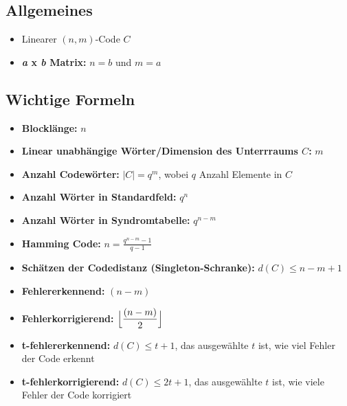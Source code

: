 \subsection{Allgemeines}

\begin{itemize}
\item Linearer $(n,m)$-Code $C$
\item \textbf{\textit{a} x \textit{b} Matrix:} $n = b$ und $m = a$
\end{itemize}

\subsection{Wichtige Formeln}

\begin{itemize}
\item \textbf{Blocklänge:} $\displaystyle n$
\item \textbf{Linear unabhängige Wörter/Dimension des Unterrraums $C$:} $m$
\item \textbf{Anzahl Codewörter:} $|C| = q^m$, wobei $q$ Anzahl Elemente in $C$
\item \textbf{Anzahl Wörter in Standardfeld:} $q^n$
\item \textbf{Anzahl Wörter in Syndromtabelle:} $q^{n-m}$
\item \textbf{Hamming Code:} $\displaystyle n = \frac{q^{n-m}-1}{q-1}$
\item \textbf{Schätzen der Codedistanz (Singleton-Schranke):} $d(C) \leq n - m + 1$
\item \textbf{Fehlererkennend:} $(n - m)$
\item \textbf{Fehlerkorrigierend:} $\displaystyle \Bigl\lfloor \frac{(n - m)}{2} \Bigr\rfloor$
\item \textbf{t-fehlererkennend:} $d(C) \leq t + 1$, das ausgewählte $t$ ist, wie viel Fehler der Code erkennt
\item \textbf{t-fehlerkorrigierend:} $d(C) \leq 2t + 1$, das ausgewählte $t$ ist, wie viele Fehler der Code korrigiert
\end{itemize}

